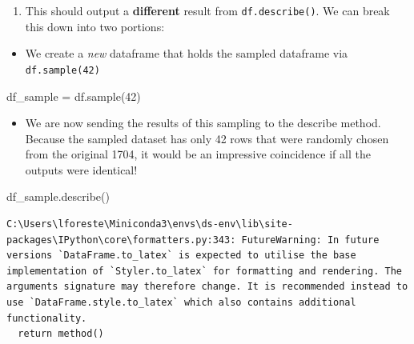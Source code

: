 \documentclass[
  letterpaper,
  DIV=11,
  numbers=noendperiod]{scrreprt}
\newenvironment{Shaded}{\begin{snugshade}}{\end{snugshade}}
\newcommand{\DecValTok}[1]{\textcolor[rgb]{0.68,0.00,0.00}{#1}}
\newcommand{\NormalTok}[1]{\textcolor[rgb]{0.00,0.23,0.31}{#1}}
\newcommand{\OperatorTok}[1]{\textcolor[rgb]{0.37,0.37,0.37}{#1}}
\providecommand{\tightlist}{%
  \setlength{\itemsep}{0pt}\setlength{\parskip}{0pt}}\usepackage{longtable,booktabs,array}
\begin{document}
\begin{tcolorbox}[enhanced jigsaw, rightrule=.15mm, opacitybacktitle=0.6, colback=white, toprule=.15mm, colframe=quarto-callout-note-color-frame, bottomtitle=1mm, bottomrule=.15mm, arc=.35mm, coltitle=black, breakable, title={Solution to Challenge 2}, titlerule=0mm, opacityback=0, colbacktitle=quarto-callout-note-color!10!white, left=2mm, toptitle=1mm, leftrule=.75mm]

\begin{enumerate}
\def\labelenumi{\arabic{enumi}.}
\tightlist
\item
  This should output a \textbf{different} result from
  \texttt{df.describe()}. We can break this down into two portions:
\end{enumerate}

\begin{itemize}
\tightlist
\item
  We create a \emph{new} dataframe that holds the sampled dataframe via
  \texttt{df.sample(42)}
\end{itemize}

\begin{Shaded}
\begin{Highlighting}[]
\NormalTok{df\_sample }\OperatorTok{=}\NormalTok{ df.sample(}\DecValTok{42}\NormalTok{)}
\end{Highlighting}
\end{Shaded}

\begin{itemize}
\tightlist
\item
  We are now sending the results of this sampling to the describe
  method. Because the sampled dataset has only 42 rows that were
  randomly chosen from the original 1704, it would be an impressive
  coincidence if all the outputs were identical!
\end{itemize}

\begin{Shaded}
\begin{Highlighting}[]
\NormalTok{df\_sample.describe()}
\end{Highlighting}
\end{Shaded}

\begin{verbatim}
C:\Users\lforeste\Miniconda3\envs\ds-env\lib\site-packages\IPython\core\formatters.py:343: FutureWarning: In future versions `DataFrame.to_latex` is expected to utilise the base implementation of `Styler.to_latex` for formatting and rendering. The arguments signature may therefore change. It is recommended instead to use `DataFrame.style.to_latex` which also contains additional functionality.
  return method()
\end{verbatim}


\end{tcolorbox}
\end{document}
